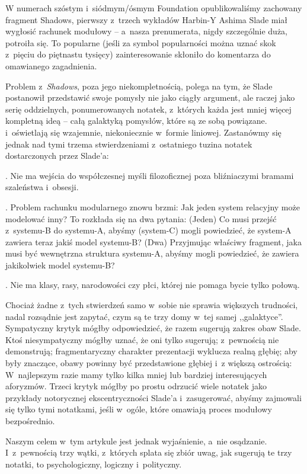\documentclass[oneside,polish,11pt,rmheadings]{mwbk}
\begin{document}
W numerach szóstym i~siódmym/ósmym Foundation opublikowaliśmy zachowany fragment Shadows, pierwszy z~trzech wykładów Harbin-Y Ashima Slade miał wygłosić rachunek modułowy -- a~nasza prenumerata, nigdy szczególnie duża, potroiła się. To popularne (jeśli za symbol popularności można uznać skok z~pięciu do piętnastu tysięcy) zainteresowanie skłoniło do komentarza do omawianego zagadnienia. 

Problem z~\textit{Shadows}, poza jego niekompletnością, polega na tym, że Slade postanowił przedstawić swoje pomysły nie jako ciągły argument, ale raczej jako serię oddzielnych, ponumerowanych notatek, z~których każda jest mniej więcej kompletną ideą -- całą galaktyką pomysłów, które są ze sobą powiązane. i~oświetlają się wzajemnie, niekoniecznie w~formie liniowej. Zastanówmy się jednak nad tymi trzema stwierdzeniami z~ostatniego tuzina notatek dostarczonych przez Slade'a: 

. Nie ma wejścia do współczesnej myśli filozoficznej poza bliźniaczymi bramami szaleństwa i~obsesji. 

. Problem rachunku modularnego znowu brzmi: Jak jeden system relacyjny może modelować inny? To rozkłada się na dwa pytania: (Jeden) Co musi przejść z~systemu-B do systemu-A, abyśmy (system-C) mogli powiedzieć, że system-A zawiera teraz jakiś model systemu-B? (Dwa) Przyjmując właściwy fragment, jaka musi być wewnętrzna struktura systemu-A, abyśmy mogli powiedzieć, że zawiera jakikolwiek model systemu-B? 

. Nie ma klasy, rasy, narodowości czy płci, której nie pomaga bycie tylko połową. 

Chociaż żadne z~tych stwierdzeń samo w~sobie nie sprawia większych trudności, nadal rozsądnie jest zapytać, czym są te trzy domy w~tej samej ,,galaktyce''. Sympatyczny krytyk mógłby odpowiedzieć, że razem sugerują zakres obaw Slade. Ktoś niesympatyczny mógłby uznać, że oni tylko sugerują; z~pewnością nie demonstrują; fragmentaryczny charakter prezentacji wyklucza realną głębię; aby były znaczące, obawy powinny być przedstawione głębiej i~z większą ostrością: W~najlepszym razie mamy tylko kilka mniej lub bardziej interesujących aforyzmów. Trzeci krytyk mógłby po prostu odrzucić wiele notatek jako przykłady notorycznej ekscentryczności Slade'a i~zasugerować, abyśmy zajmowali się tylko tymi notatkami, jeśli w~ogóle, które omawiają proces modułowy bezpośrednio. 

Naszym celem w~tym artykule jest jednak wyjaśnienie, a~nie osądzanie. I~z~pewnością trzy wątki, z~których splata się zbiór uwag, jak sugerują te trzy notatki, to psychologiczny, logiczny i~polityczny. 
\end{document}
